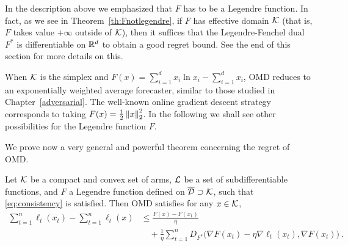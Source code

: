 In the description above we emphasized that $F$ has to be a Legendre function. In fact, as we see in Theorem~\ref{th:Fnotlegendre}, if $F$ has effective domain $\mathcal{K}$ (that is, $F$ takes value $+\infty$ outside of $\mathcal{K}$), then it suffices that the Legendre-Fenchel dual $F^*$ is differentiable on $\mathbb{R}^d$ to obtain a good regret bound. See the end of this section for more details on this.

When $\mathcal{K}$ is the simplex and $F(x) = \sum_{i=1}^d x_i \ln x_i - \sum_{i=1}^d x_i$, OMD reduces to 
an exponentially weighted average forecaster, similar to those studied in Chapter~\ref{adversarial}. The well-known online gradient descent strategy corresponds to taking $F(x) = \frac12 \left\|{x}\right\|^2_2$. In the following we shall see other possibilities for the Legendre function $F$.

We prove now a very general and powerful theorem concerning the regret of OMD.
%
\begin{theorem} \label{th:MGD}
Let $\mathcal{K}$ be a compact and convex set of arms, $\mathcal{L}$ be a set of subdifferentiable functions, and $F$ a Legendre function defined on $\overline{\mathcal{D}} \supset \mathcal{K}$, such that \eqref{eq:consistency} is satisfied. Then OMD satisfies for any $x \in \mathcal{K}$,
\begin{align*}
\sum_{t=1}^n \ell_t(x_t) - \sum_{t=1}^n \ell_t(x)
& \leq \frac{F(x) - F(x_1)}{\eta} \\
&  \quad + \frac{1}{\eta} \sum_{t=1}^n D_{F^*}\bigg(\nabla F(x_t) - \eta \nabla \ell_t(x_t), \nabla F(x_t)\bigg)~.
\end{align*}
\end{theorem}
%
